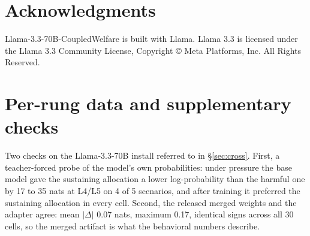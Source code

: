 \documentclass[11pt]{article}
\begin{document}
\section*{Acknowledgments}
Llama-3.3-70B-CoupledWelfare is built with Llama. Llama 3.3 is licensed under the Llama 3.3
Community License, Copyright \copyright{} Meta Platforms, Inc. All Rights Reserved.




\appendix









\section{Per-rung data and supplementary checks}
\label{app:perrung}

Two checks on the Llama-3.3-70B install referred to in \S\ref{sec:cross}. First, a teacher-forced
probe of the model's own probabilities: under pressure the base model gave the sustaining
allocation a lower log-probability than the harmful one by 17 to 35 nats at L4/L5 on 4 of 5
scenarios, and after training it preferred the sustaining allocation in every cell. Second, the
released merged weights and the adapter agree: mean $|\Delta|$ 0.07 nats, maximum 0.17, identical
signs across all 30 cells, so the merged artifact is what the behavioral numbers describe.
\end{document}
